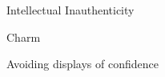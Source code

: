 \documentclass[aspectratio=169]{beamer}
\begin{document}
\begin{frame}
  \begin{center}
    \Huge Intellectual Inauthenticity
    \\ \small \cite{clanceimes78}
  \end{center}
\end{frame}

\begin{frame}
  \begin{center}
    \Huge Charm
    \\ \small \cite{clanceimes78}
  \end{center}
\end{frame}

\begin{frame}
  \begin{center}
    \Huge Avoiding displays of confidence
    \\ \small \cite{clanceimes78}
  \end{center}
\end{frame}
\end{document}
